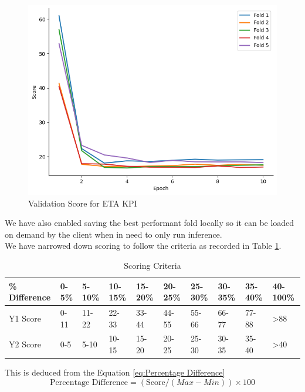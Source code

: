 \documentclass{report} %
\begin{document}
\begin{figure}[H]
    \hfill
    \begin{minipage}[b]{0.325\textwidth}
        \includegraphics[width=\textwidth]{./ReportImages/val_score_y2.png}
        \caption{\centering Validation Score for ETA \ac{KPI}}
        \label{fig:Validation Score for ETA grid}
    \end{minipage}
\end{figure}

We have also enabled saving the best performant fold locally so it can be loaded on demand by the client when in need to only run inference.\\
We have narrowed down scoring to follow the criteria as recorded in Table \ref{tab:Scoring Criteria}.

\begin{table}[H]
    \centering
    \begin{tabularx}{1\linewidth}{|X|X|X|X|X|X|X|X|X|X|}
    \hline {\bf \% Difference} & {\bf 0-5\%} & {\bf 5-10\%} & {\bf 10-15\%} & {\bf 15-20\%} & {\bf 20-25\%} & {\bf 25-30\%} & {\bf 30-35\%} & {\bf 35-40\%} & {\bf 40-100\%}\\
    \hline 
    Y1 Score& 0-11& 11-22 & 22-33 & 33-44 & 44-55& 55-66 & 66-77 & 77-88 & \textgreater 88\\
    Y2 Score& 0-5 & 5-10 & 10-15 & 15-20 & 20-25& 25-30 & 30-35 & 35-40 &\textgreater 40\\
    \hline
    \end{tabularx}
    \caption{Scoring Criteria}
    \label{tab:Scoring Criteria}
\end{table}

This is deduced from the Equation \ref{eq:Percentage Difference}
\begin{equation}
    \text{Percentage Difference} = (\text{Score} / {(Max - Min)})  \times 100
    \label{eq:Percentage Difference}
\end{equation}
\end{document}
